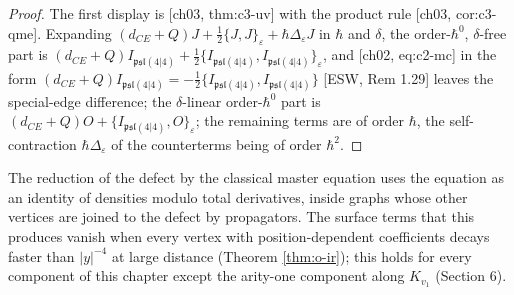 \begin{proof}
The first display is [ch03, thm:c3-uv] with the product rule [ch03, cor:c3-qme]. Expanding $(d_{CE}+Q)J+\tfrac12\{J,J\}_\varepsilon+\hbar\Delta_\varepsilon J$ in $\hbar$ and $\delta$, the order-$\hbar^0$, $\delta$-free part is $(d_{CE}+Q)I_{\mathfrak{psl}(4|4)}+\tfrac12\{I_{\mathfrak{psl}(4|4)},I_{\mathfrak{psl}(4|4)}\}_\varepsilon$, and [ch02, eq:c2-mc] in the form $(d_{CE}+Q)I_{\mathfrak{psl}(4|4)}=-\tfrac12\{I_{\mathfrak{psl}(4|4)},I_{\mathfrak{psl}(4|4)}\}$ [ESW, Rem 1.29] leaves the special-edge difference; the $\delta$-linear order-$\hbar^0$ part is $(d_{CE}+Q)O+\{I_{\mathfrak{psl}(4|4)},O\}_\varepsilon$; the remaining terms are of order $\hbar$, the self-contraction $\hbar\Delta_\varepsilon$ of the counterterms being of order $\hbar^2$.
\end{proof}

The reduction of the defect by the classical master equation uses the equation as an identity of densities modulo total derivatives, inside graphs whose other vertices are joined to the defect by propagators. The surface terms that this produces vanish when every vertex with position-dependent coefficients decays faster than $|y|^{-4}$ at large distance (Theorem \ref{thm:o-ir}); this holds for every component of this chapter except the arity-one component along $K_{v_1}$ (Section 6).

